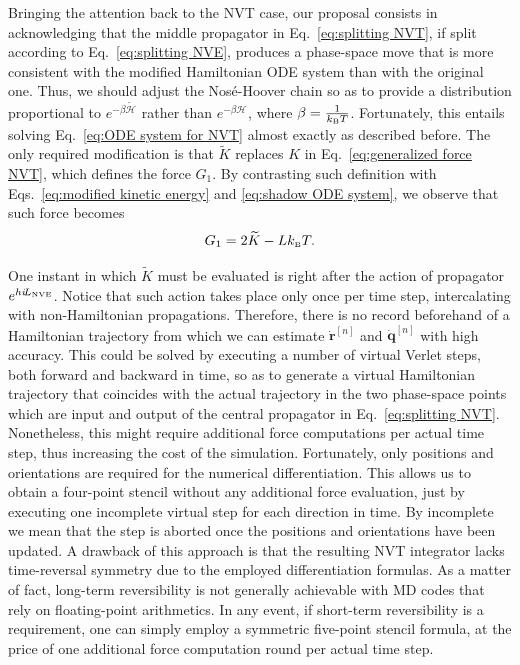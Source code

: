 \documentclass[
journal=jctcce,
layout=twocolumn
]{achemso}
\newcommand{\vt}[1]{\boldsymbol{\mathbf{#1}}}   %
\newcommand{\Ham}[1]{{\mathcal H}_\text{#1}}    %
\newcommand{\Liu}[1]{i\!L_\text{#1}}            %
\newcommand{\timestep}{h}
\newcommand{\modified}[1]{\widetilde{#1}}
\begin{document}
Bringing the attention back to the NVT case, our proposal consists in acknowledging that the middle propagator in Eq.~\eqref{eq:splitting NVT}, if split according to Eq.~\eqref{eq:splitting NVE}, produces a phase-space move that is more consistent with the modified Hamiltonian ODE system than with the original one. Thus, we should adjust the Nos\'e-Hoover chain so as to provide a distribution proportional to $e^{-\beta \modified{\Ham{}}}$ rather than $e^{-\beta \Ham{}}$, where $\beta = \frac{1}{k_\text{\tiny B} T}$. Fortunately, this entails solving Eq.~\eqref{eq:ODE system for NVT} almost exactly as described before. The only required modification is that $\modified K$ replaces $K$ in Eq.~\eqref{eq:generalized force NVT}, which defines the force $G_1$. By contrasting such definition with Eqs.~\eqref{eq:modified kinetic energy} and \eqref{eq:shadow ODE system}, we observe that such force becomes
\begin{equation}
G_1 = 2 \modified K - L k_\text{\tiny B} T.
\end{equation}

One instant in which $\modified K$ must be evaluated is right after the action of propagator $e^{\timestep \Liu{\tiny NVE}}$. Notice that such action takes place only once per time step, intercalating with non-Hamiltonian propagations. Therefore, there is no record beforehand of a Hamiltonian trajectory from which we can estimate $\dot{\vt r}^{[n]}$ and $\dot{\vt q}^{[n]}$ with high accuracy. This could be solved by executing a number of virtual Verlet steps, both forward and backward in time, so as to generate a virtual Hamiltonian trajectory that coincides with the actual trajectory in the two phase-space points which are input and output of the central propagator in Eq.~\eqref{eq:splitting NVT}. Nonetheless, this might require additional force computations per actual time step, thus increasing the cost of the simulation. Fortunately, only positions and orientations are required for the numerical differentiation. This allows us to obtain a four-point stencil without any additional force evaluation, just by executing one incomplete virtual step for each direction in time. By incomplete we mean that the step is aborted once the positions and orientations have been updated. A drawback of this approach is that the resulting NVT integrator lacks time-reversal symmetry due to the employed differentiation formulas. As a matter of fact, long-term reversibility is not generally achievable with MD codes that rely on floating-point arithmetics. In any event, if short-term reversibility is a requirement, one can simply employ a symmetric five-point stencil formula, at the price of one additional force computation round per actual time step.
\end{document}
